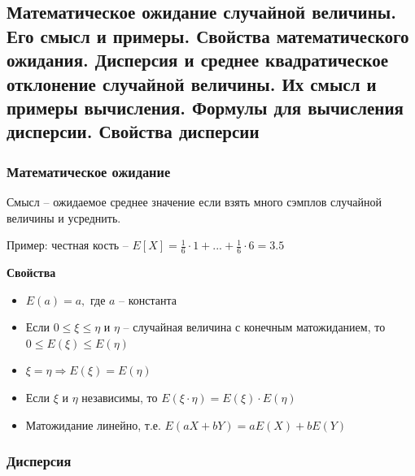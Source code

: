 \documentclass{article}
\begin{document}
\subsection{Математическое ожидание случайной величины. Его смысл и примеры. Свойства математического ожидания. Дисперсия и среднее квадратическое отклонение случайной величины. Их смысл и примеры вычисления. Формулы для вычисления дисперсии. Свойства дисперсии}

\subsubsection{Математическое ожидание}


Смысл -- ожидаемое среднее значение если взять много сэмплов случайной величины и усреднить.

Пример: честная кость -- $E[X] = \frac{1}{6} \cdot 1 + ... + \frac{1}{6} \cdot 6 = 3.5$

{\bf Свойства}

\begin{itemize}
	\item $E(a) = a,$ где $a$ -- константа
	\item Если $0 \le \xi \le \eta$ и $\eta$ -- случайная величина с конечным матожиданием, то $0 \le E(\xi) \le E(\eta)$
	\item $\xi = \eta \Rightarrow E(\xi) = E(\eta)$
	\item Если $\xi$ и $\eta$ независимы, то $E(\xi \cdot \eta) = E(\xi) \cdot E(\eta)$
	\item Матожидание линейно, т.е. $E(aX + bY) = aE(X) + bE(Y)$
	
\end{itemize}

\subsubsection{Дисперсия}

\end{document}
